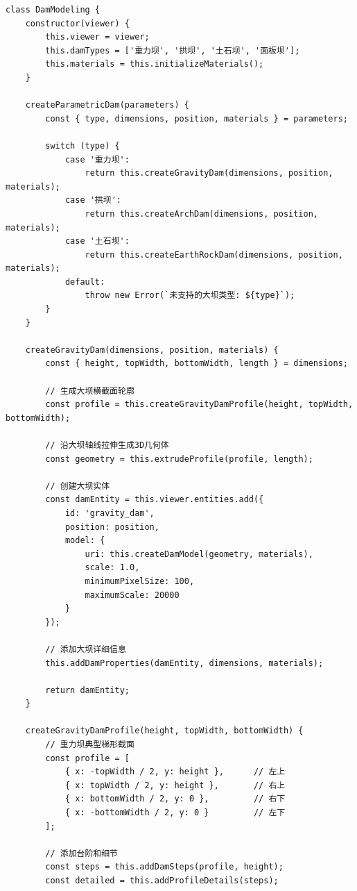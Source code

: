\begin{lstlisting}
class DamModeling {
    constructor(viewer) {
        this.viewer = viewer;
        this.damTypes = ['重力坝', '拱坝', '土石坝', '面板坝'];
        this.materials = this.initializeMaterials();
    }
    
    createParametricDam(parameters) {
        const { type, dimensions, position, materials } = parameters;
        
        switch (type) {
            case '重力坝':
                return this.createGravityDam(dimensions, position, materials);
            case '拱坝':
                return this.createArchDam(dimensions, position, materials);
            case '土石坝':
                return this.createEarthRockDam(dimensions, position, materials);
            default:
                throw new Error(`未支持的大坝类型: ${type}`);
        }
    }
    
    createGravityDam(dimensions, position, materials) {
        const { height, topWidth, bottomWidth, length } = dimensions;
        
        // 生成大坝横截面轮廓
        const profile = this.createGravityDamProfile(height, topWidth, bottomWidth);
        
        // 沿大坝轴线拉伸生成3D几何体
        const geometry = this.extrudeProfile(profile, length);
        
        // 创建大坝实体
        const damEntity = this.viewer.entities.add({
            id: 'gravity_dam',
            position: position,
            model: {
                uri: this.createDamModel(geometry, materials),
                scale: 1.0,
                minimumPixelSize: 100,
                maximumScale: 20000
            }
        });
        
        // 添加大坝详细信息
        this.addDamProperties(damEntity, dimensions, materials);
        
        return damEntity;
    }
    
    createGravityDamProfile(height, topWidth, bottomWidth) {
        // 重力坝典型梯形截面
        const profile = [
            { x: -topWidth / 2, y: height },      // 左上
            { x: topWidth / 2, y: height },       // 右上  
            { x: bottomWidth / 2, y: 0 },         // 右下
            { x: -bottomWidth / 2, y: 0 }         // 左下
        ];
        
        // 添加台阶和细节
        const steps = this.addDamSteps(profile, height);
        const detailed = this.addProfileDetails(steps);
        

\end{lstlisting}
